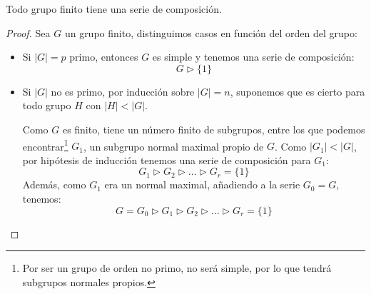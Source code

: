 \begin{prop}
    Todo grupo finito tiene una serie de composición.
    \begin{proof}
        Sea $G$ un grupo finito, distinguimos casos en función del orden del grupo:
        \begin{itemize}
            \item Si $|G| = p$ primo, entonces $G$ es simple y tenemos una serie de composición:
                \begin{equation*}
                    G \rhd \{1\}
                \end{equation*}
            \item Si $|G|$ no es primo, por inducción sobre $|G| = n$, suponemos que es cierto para todo grupo $H$ con $|H|<|G|$.

                Como $G$ es finito, tiene un número finito de subgrupos, entre los que podemos encontrar\footnote{Por ser un grupo de orden no primo, no será simple, por lo que tendrá subgrupos normales propios.} $G_1$, un subgrupo normal maximal propio de $G$. Como $|G_1| < |G|$, por hipótesis de inducción tenemos una serie de composición para $G_1$:
                \begin{equation*}
                    G_1 \rhd G_2 \rhd \ldots \rhd G_r = \{1\}
                \end{equation*}
                Además, como $G_1$ era un normal maximal, añadiendo a la serie $G_0 = G$, tenemos:
                \begin{equation*}
                    G = G_0 \rhd G_1 \rhd G_2 \rhd \ldots \rhd G_r = \{1\}
                \end{equation*}
        \end{itemize}
    \end{proof}
\end{prop}

